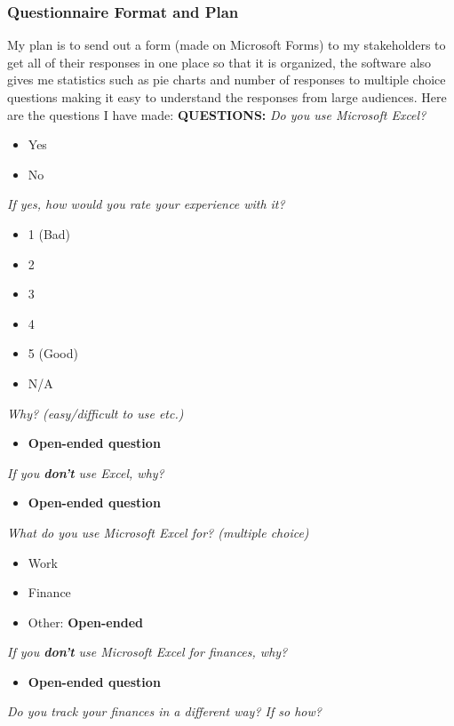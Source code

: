 \documentclass{article}
\begin{document}
\subsubsection{Questionnaire Format and Plan}
My plan is to send out a form (made on Microsoft Forms) to my stakeholders to get all of their responses in one place so that it is organized, the software also gives me statistics such as pie charts and number of responses to multiple choice questions making it easy to understand the responses from large audiences. Here are the questions I have made: \newline \newline
\textbf{QUESTIONS:} \newline
\textit{Do you use Microsoft Excel?}
\begin{itemize}
    \item Yes
    \item No
\end{itemize}
\textit{If yes, how would you rate your experience with it?}
\begin{itemize}
    \item 1 (Bad)
    \item 2
    \item 3
    \item 4
    \item 5 (Good)
    \item N/A
\end{itemize}
\textit{Why? (easy/difficult to use etc.)}
\begin{itemize}
    \item \textbf{Open-ended question}
\end{itemize}
\textit{If you \textbf{don't} use Excel, why?}
\begin{itemize}
    \item \textbf{Open-ended question}
\end{itemize}
\textit{What do you use Microsoft Excel for? (multiple choice)}
\begin{itemize}
    \item Work
    \item Finance
    \item Other: \textbf{Open-ended}
\end{itemize}
\textit{If you \textbf{don't} use Microsoft Excel for finances, why?}
\begin{itemize}
    \item \textbf{Open-ended question}
\end{itemize}
\textit{Do you track your finances in a different way? If so how?}
\end{document}
